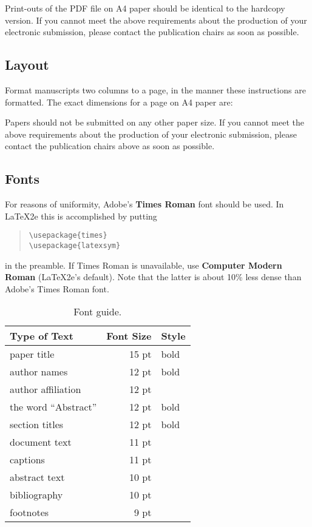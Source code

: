 \documentclass[11pt,a4paper]{article}
\begin{document}
Print-outs of the PDF file on A4 paper should be identical to the
hardcopy version. If you cannot meet the above requirements about the
production of your electronic submission, please contact the
publication chairs as soon as possible.

\subsection{Layout}
\label{ssec:layout}

Format manuscripts two columns to a page, in the manner these
instructions are formatted. The exact dimensions for a page on A4
paper are:

\noindent Papers should not be submitted on any other paper size.
 If you cannot meet the above requirements about the production of 
 your electronic submission, please contact the publication chairs 
 above as soon as possible.

\subsection{Fonts}

For reasons of uniformity, Adobe's {\bf Times Roman} font should be
used. In \LaTeX2e{} this is accomplished by putting

\begin{quote}
\begin{verbatim}
\usepackage{times}
\usepackage{latexsym}
\end{verbatim}
\end{quote}
in the preamble. If Times Roman is unavailable, use {\bf Computer
  Modern Roman} (\LaTeX2e{}'s default).  Note that the latter is about
  10\% less dense than Adobe's Times Roman font.

\begin{table}[h]
\begin{center}
\begin{tabular}{|l|rl|}
\hline \bf Type of Text & \bf Font Size & \bf Style \\ \hline
paper title & 15 pt & bold \\
author names & 12 pt & bold \\
author affiliation & 12 pt & \\
the word ``Abstract'' & 12 pt & bold \\
section titles & 12 pt & bold \\
document text & 11 pt  &\\
captions & 11 pt & \\
abstract text & 10 pt & \\
bibliography & 10 pt & \\
footnotes & 9 pt & \\
\hline
\end{tabular}
\end{center}
\caption{\label{font-table} Font guide. }
\end{table}
\end{document}
